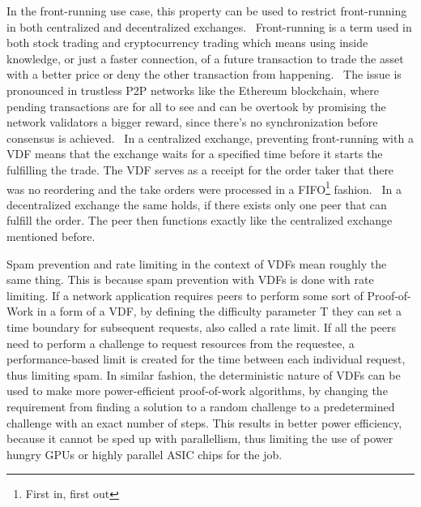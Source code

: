 In the front-running use case, this property can be used to restrict front-running in both centralized and decentralized exchanges.~\cite{Khalil2019-sl} Front-running is a term used in both stock trading and cryptocurrency trading which means using inside knowledge, or just a faster connection, of a future transaction to trade the asset with a better price or deny the other transaction from happening.~\cite{Robinson2020-ve} The issue is pronounced in trustless P2P networks like the Ethereum blockchain, where pending transactions are for all to see and can be overtook by promising the network validators a bigger reward, since there's no synchronization before consensus is achieved.~\cite{Mitchell2020-hn} In a centralized exchange, preventing front-running with a VDF means that the exchange waits for a specified time before it starts the fulfilling the trade. The VDF serves as a receipt for the order taker that there was no reordering and the take orders were processed in a FIFO\footnote{First in, first out} fashion.~\cite{Cline2020-wb} In a decentralized exchange the same holds, if there exists only one peer that can fulfill the order. The peer then functions exactly like the centralized exchange mentioned before.

Spam prevention and rate limiting in the context of VDFs mean roughly the same thing. This is because spam prevention with VDFs is done with rate limiting. If a network application requires peers to perform some sort of Proof-of-Work in a form of a VDF, by defining the difficulty parameter T they can set a time boundary for subsequent requests, also called a rate limit. If all the peers need to perform a challenge to request resources from the requestee, a performance-based limit is created for the time between each individual request, thus limiting spam. In similar fashion, the deterministic nature of VDFs can be used to make more power-efficient proof-of-work algorithms, by changing the requirement from finding a solution to a random challenge to a predetermined challenge with an exact number of steps. This results in better power efficiency, because it cannot be sped up with parallellism, thus limiting the use of power hungry GPUs or highly parallel ASIC chips for the job.


